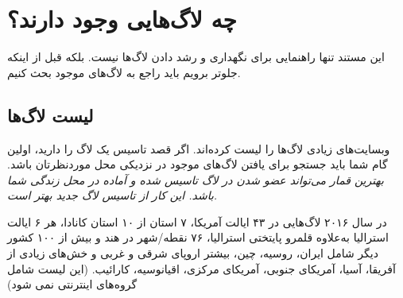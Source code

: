 \section{چه لاگ‌هایی وجود دارند؟}

این مستند تنها راهنمایی برای نگهداری و رشد دادن لاگ‌ها نیست.
بلکه قبل از اینکه جلوتر برویم باید راجع به لاگ‌های موجود بحث کنیم.

\subsection{لیست لاگ‌ها}

وبسایت‌های زیادی لاگ‌ها را لیست کرده‌اند. اگر قصد تاسیس یک لاگ را دارید،
اولین گام شما باید جستجو برای یافتن لاگ‌های موجود در نزدیکی محل موردنظرتان باشد. 
{\itshape
بهترین قمار می‌تواند عضو شدن در لاگ تاسیس شده و آماده در محل زندگی شما باشد.
این کار از تاسیس لاگ جدید بهتر است.
}

در سال ۲۰۱۶ لاگ‌هایی در ۴۳ ایالت آمریکا، ۷ استان از ۱۰ استان کانادا،
هر ۶ ایالت استرالیا به‌علاوه قلمرو پایتختی استرالیا، ۷۶ نقطه/شهر در هند و
بیش از ۱۰۰ کشور دیگر شامل ایران، روسیه، چین، بیشتر اروپای شرقی و غربی
و خش‌های زیادی از آفریقا، آسیا، آمریکای جنوبی، آمریکای مرکزی، اقیانوسیه، کارائیب.
(این لیست شامل گروه‌های اینترنتی
نمی ‌شود)


